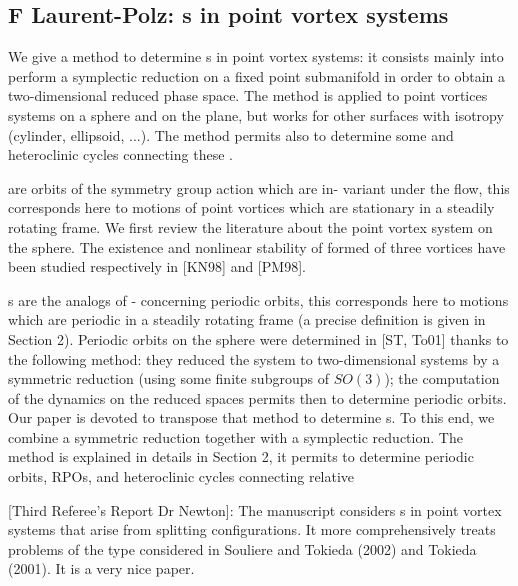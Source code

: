 \subsection{F Laurent-Polz: {\Rpo s} in point vortex systems}

We give a method to determine {\rpo s} in point vortex systems: it consists mainly into perform a symplectic reduction on a fixed point submanifold in order to obtain a two-dimensional reduced phase space. The method is applied to point vortices systems on a sphere and on the plane, but works for other surfaces with isotropy (cylinder, ellipsoid, ...). The method permits also to determine some 
{\reqva} and heteroclinic cycles connecting these {\reqva}.

    {\Reqva} are orbits of the symmetry group action which are in-
variant under the flow, this corresponds here to motions of point vortices which
are stationary in a steadily rotating frame. We first review the literature about
the point vortex system on the sphere. The existence and nonlinear stability
of {\reqva} formed of three vortices have been studied respectively in
[KN98] and [PM98]. 

    {\Rpo s} are the analogs of {\reqva}
- concerning periodic orbits, this corresponds here to motions which are
periodic in a steadily rotating frame (a precise definition is given in Section
2). Periodic orbits on the sphere were determined in [ST, To01] thanks to the
following method: they reduced the system to two-dimensional systems by a
symmetric reduction (using some finite subgroups of $SO(3)$); the computation
of the dynamics on the reduced spaces permits then to determine periodic orbits.
Our paper is devoted to transpose that method to determine {\rpo s}. To this end, we combine a symmetric reduction together with a symplectic reduction. 
The method is explained in details in Section 2, it permits
to determine periodic orbits, RPOs, and heteroclinic cycles connecting relative

[Third Referee's Report Dr Newton]:
The manuscript considers {\rpo s} in point vortex systems
that arise from splitting {\reqv} configurations. It more
comprehensively treats problems of the type considered in Souliere and
Tokieda (2002) and Tokieda (2001). It is a very nice paper.

